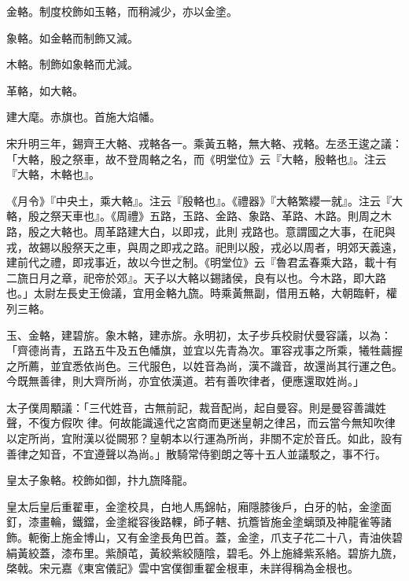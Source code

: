 \begin{pinyinscope}
 金輅。制度校飾如玉輅，而稍減少，亦以金塗。



 象輅。如金輅而制飾又減。



 木輅。制飾如象輅而尤減。



 革輅，如大輅。



 建大麾。赤旗也。首施大焰幡。



 宋升明三年，錫齊王大輅、戎輅各一。乘黃五輅，無大輅、戎輅。左丞王逡之議：「大輅，殷之祭車，故不登周輅之名，而《明堂位》云『大輅，殷輅也』。注云『大輅，木輅也』。



 《月令》『中央土，乘大輅』。注云『殷輅也』。《禮器》『大輅繁纓一就』。注云『大輅，殷之祭天車也』。《周禮》五路，玉路、金路、象路、革路、木路。則周之木路，殷之大輅也。周革路建大白，以即戎，此則
 戎路也。意謂國之大事，在祀與戎，故錫以殷祭天之車，與周之即戎之路。祀則以殷，戎必以周者，明郊天義遠，建前代之禮，即戎事近，故以今世之制。《明堂位》云『魯君孟春乘大路，載十有二旒日月之章，祀帝於郊』。天子以大輅以錫諸侯，良有以也。今木路，即大路也。」太尉左長史王儉議，宜用金輅九旒。時乘黃無副，借用五輅，大朝臨軒，權列三輅。



 玉、金輅，建碧旂。象木輅，建赤旂。永明初，太子步兵校尉伏曼容議，以為：「齊德尚青，五路五牛及五色幡旗，並宜以先青為次。軍容戎事之所乘，犧牲繭握之所薦，並宜悉依尚色。三代服色，以姓音為尚，漢不識音，故還尚其行運之色。今既無善律，則大齊所尚，亦宜依漢道。若有善吹律者，便應還取姓尚。」



 太子僕周顒議：「三代姓音，古無前記，裁音配尚，起自曼容。則是曼容善識姓聲，不復方假吹
 律。何故能識遠代之宮商而更迷皇朝之律呂，而云當今無知吹律以定所尚，宜附漢以從闕邪？皇朝本以行運為所尚，非關不定於音氏。如此，設有善律之知音，不宜遵聲以為尚。」散騎常侍劉朗之等十五人並議駁之，事不行。



 皇太子象輅。校飾如御，抃九旒降龍。



 皇太后皇后重翟車，金塗校具，白地人馬錦帖，廂隱膝後戶，白牙的帖，金塗面釘，漆畫輪，鐵鐺，金塗縱容後路輠，師子轄、抗簷皆施金塗螭頭及神龍雀等諸飾。軛衡上施金博山，又有金塗長角巴首。蓋，金塗，爪支子花二十八，青油俠碧絹黃絞蓋，漆布里。紫顏芚，黃絞紫絞隨陰，碧毛。外上施絳紫系絡。碧旂九旒，棨戟。宋元嘉《東宮儀記》雲中宮僕御重翟金根車，未詳得稱為金根也。




\end{pinyinscope}
